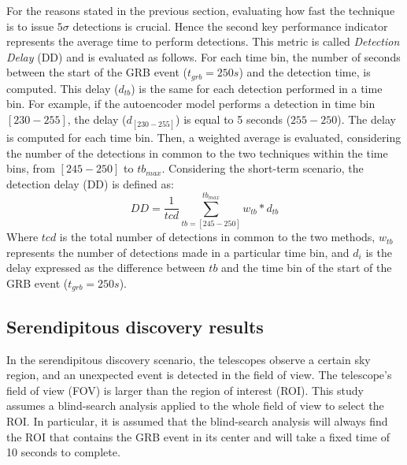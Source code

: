 For the reasons stated in the previous section, evaluating how fast the technique is to issue $5\sigma$ detections is crucial. Hence the second key performance indicator represents the average time to perform detections. This metric is called \textit{Detection Delay} (DD) and is evaluated as follows. For each time bin, the number of seconds between the start of the GRB event ($t_{grb}=250s$) and the detection time, is computed. This delay ($d_{tb}$) is the same for each detection performed in a time bin. For example, if the autoencoder model performs a detection in time bin $[230-255]$, the delay ($d_{[230-255]}$) is equal to 5 seconds ($255-250$). The delay is computed for each time bin. Then, a weighted average is evaluated, considering the number of the detections in common to the two techniques within the time bins, from $[245-250]$ to $tb_{max}$. Considering the short-term scenario, the detection delay (DD) is defined as:
\begin{equation}
    DD = \frac{1}{tcd} \sum_{tb=[245-250]}^{tb_{max}} w_{tb}*d_{tb}
\end{equation}
Where $tcd$ is the total number of detections in common to the two methods, $w_{tb}$ represents the number of detections made in a particular time bin, and $d_i$ is the delay expressed as the difference between $tb$ and the time bin of the start of the GRB event ($t_{grb}=250s$). 

\FloatBarrier
\subsection{Serendipitous discovery results}
\label{s:Serendipitous-Discoveries-Results}
In the serendipitous discovery scenario, the telescopes observe a certain sky region, and an unexpected event is detected in the field of view. The telescope's field of view (FOV) is larger than the region of interest (ROI). This study assumes a blind-search analysis applied to the whole field of view to select the ROI. In particular, it is assumed that the blind-search analysis will always find the ROI that contains the GRB event in its center and will take a fixed time of 10 seconds to complete.

\FloatBarrier
